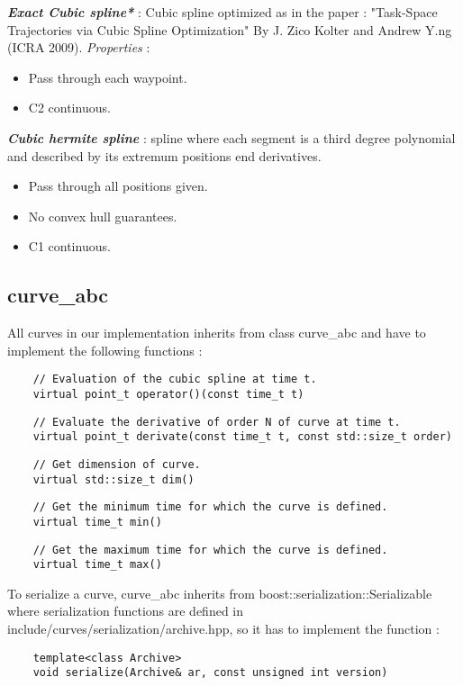 \documentclass{article}
\begin{document}
    \noindent
    \textbf{\textit{Exact Cubic spline*}} : Cubic spline optimized as in the paper : "Task-Space Trajectories via Cubic Spline Optimization" By J. Zico Kolter and Andrew Y.ng (ICRA 2009). \textit{Properties} :
     \begin{itemize}
        \item Pass through each waypoint.
        \item C2 continuous.
    \end{itemize}

    \noindent
    \textbf{\textit{Cubic hermite spline}} : spline where each segment is a third degree polynomial and described by its extremum positions end derivatives.
    \begin{itemize}
        \item Pass through all positions given.
        \item No convex hull guarantees.
        \item C1 continuous.
    \end{itemize}

\subsection{curve\_abc}
    All curves in our implementation inherits from class curve\_abc and have to implement the following functions :\\
    \begin{lstlisting}
    // Evaluation of the cubic spline at time t.
    virtual point_t operator()(const time_t t)
    \end{lstlisting}
    \begin{lstlisting}
    // Evaluate the derivative of order N of curve at time t.
    virtual point_t derivate(const time_t t, const std::size_t order)
    \end{lstlisting}
    \begin{lstlisting}
    // Get dimension of curve.
    virtual std::size_t dim()
    \end{lstlisting}
    \begin{lstlisting}
    // Get the minimum time for which the curve is defined.
    virtual time_t min()
    \end{lstlisting}
    \begin{lstlisting}
    // Get the maximum time for which the curve is defined.
    virtual time_t max()
    \end{lstlisting}

    To serialize a curve, curve\_abc inherits from boost::serialization::Serializable where serialization functions are defined in include/curves/serialization/archive.hpp, so it has to implement the function :
    \begin{lstlisting}
    template<class Archive>
    void serialize(Archive& ar, const unsigned int version)
    \end{lstlisting}
\end{document}
